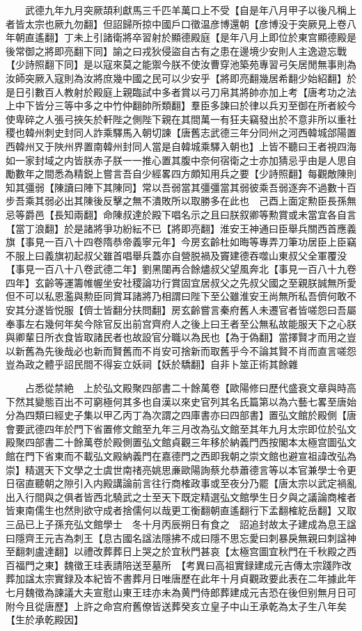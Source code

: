 　　武德九年九月突厥頡利獻馬三千匹羊萬口上不受【自是年八月甲子以後凡稱上者皆太宗也厥九勿翻】但詔歸所掠中國戶口徵温彦博還朝【彦博没于突厥見上卷八年朝直遙翻】丁未上引諸衛將卒習射於顯德殿庭【是年八月上即位於東宫顯德殿是後常御之將即亮翻下同】諭之曰戎狄侵盜自古有之患在邊境少安則人主逸遊忘戰【少詩照翻下同】是以寇來莫之能禦今朕不使汝曹穿池築苑專習弓矢居閒無事則為汝師突厥入寇則為汝將庶幾中國之民可以少安乎【將即亮翻幾居希翻少始紹翻】於是日引數百人教射於殿庭上親臨試中多者賞以弓刀帛其將帥亦加上考【唐考功之法上中下皆分三等中多之中竹仲翻帥所類翻】羣臣多諫曰於律以兵刃至御在所者絞今使卑碎之人張弓挾矢於軒陛之側陛下親在其間萬一有狂夫竊發出於不意非所以重社稷也韓州刺史封同人詐乘驛馬入朝切諫【唐舊志武德三年分同州之河西韓城郃陽置西韓州又于陜州界置南韓州封同人當是自韓城乘驛入朝也】上皆不聽曰王者視四海如一家封域之内皆朕赤子朕一一推心置其腹中奈何宿衛之士亦加猜忌乎由是人思自勵數年之間悉為精鋭上嘗言吾自少經畧四方頗知用兵之要【少詩照翻】每觀敵陳則知其彊弱【陳讀曰陣下其陳同】常以吾弱當其彊彊當其弱彼乘吾弱逐奔不過數十百步吾乘其弱必出其陳後反擊之無不潰敗所以取勝多在此也　己酉上面定勲臣長孫無忌等爵邑【長知兩翻】命陳叔達於殿下唱名示之且曰朕叙卿等勲賞或未當宜各自言【當丁浪翻】於是諸將爭功紛紜不已【將即亮翻】淮安王神通曰臣舉兵關西首應義旗【事見一百八十四卷隋恭帝義寧元年】今房玄齡杜如晦等專弄刀筆功居臣上臣竊不服上曰義旗初起叔父雖首唱舉兵蓋亦自營脱禍及竇建德吞噬山東叔父全軍覆没【事見一百八十八卷武德二年】劉黑闥再合餘燼叔父望風奔北【事見一百八十九卷四年】玄齡等運籌帷幄坐安社稷論功行賞固宜居叔父之先叔父國之至親朕誠無所愛但不可以私恩濫與勲臣同賞耳諸將乃相謂曰陛下至公雖淮安王尚無所私吾儕何敢不安其分遂皆悦服【儕士皆翻分扶問翻】房玄齡嘗言秦府舊人未遷官者皆嗟怨曰吾屬奉事左右幾何年矣今除官反出前宫齊府人之後上曰王者至公無私故能服天下之心朕與卿輩日所衣食皆取諸民者也故設官分職以為民也【為于偽翻】當擇賢才而用之豈以新舊為先後哉必也新而賢舊而不肖安可捨新而取舊乎今不論其賢不肖而直言嗟怨豈為政之體乎詔民間不得妄立妖祠【妖於驕翻】自非卜筮正術其餘雜

　　占悉從禁絶　上於弘文殿聚四部書二十餘萬卷【歐陽修曰歷代盛衰文章與時高下然其變態百出不可窮極何其多也自漢以來史官列其名氏篇第以為六藝七畧至唐始分為四類曰經史子集以甲乙丙丁為次謂之四庫書亦曰四部書】置弘文館於殿側【唐會要武德四年於門下省置修文館至九年三月改為弘文館至其年九月太宗即位於弘文殿聚四部書二十餘萬卷於殿側置弘文館貞觀三年移於納義門西按閣本太極宫圖弘文館在門下省東而不載弘文殿納義門在嘉德門之西即我朝之崇文館也避宣祖諱改弘為崇】精選天下文學之士虞世南禇亮姚思亷歐陽詢蔡允恭蕭德言等以本官兼學士令更日宿直聽朝之隙引入内殿講論前言往行商榷政事或至夜分乃罷【唐太宗以武定禍亂出入行間與之俱者皆西北驍武之士至天下既定精選弘文館學生日夕與之議論商榷者皆東南儒生也然則欲守成者捨儒何以哉更工衡翻朝直遙翻行下孟翻榷紇岳翻】又取三品已上子孫充弘文館學士　冬十月丙辰朔日有食之　詔追封故太子建成為息王諡曰隱齊王元吉為刺王【息古國名諡法隱拂不成曰隱不思忘愛曰刺暴戾無親曰刺諡神至翻刺盧達翻】以禮改葬葬日上哭之於宜秋門甚哀【太極宫圖宜秋門在千秋殿之西百福門之東】魏徵王珪表請陪送至墓所　【考異曰高祖實録建成元吉傳太宗踐阼改葬加諡太宗實録及本紀皆不書葬月日唯唐歷在此年十月貞觀政要此表在二年據此年七月魏徵為諫議大夫宣慰山東王珪亦未為黄門侍郎葬建成元吉恐在後但别無月日可附今且從唐歷】上許之命宫府舊僚皆送葬癸亥立皇子中山王承乾為太子生八年矣【生於承乾殿因】

